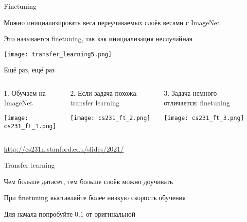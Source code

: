 \documentclass[notes,12pt, aspectratio=169]{beamer}
\newenvironment{wideitemize}{\itemize\addtolength{\itemsep}{10pt}}{\enditemize}
\begin{document}
\begin{frame}{Finetuning}
\begin{wideitemize}
	\item  Можно инициализировать веса переучиваемых слоёв весами с ImageNet
	\item  Это называется \alert{finetuning,} так как инициализация неслучайная
\end{wideitemize}
\begin{center}
	\texttt{[image: transfer\_learning5.png]}
\end{center}
\end{frame}


\begin{frame}{Ещё раз, ещё раз}
	\begin{columns}
	\begin{column}{0.33\textwidth}
		\alert{1. Обучаем на ImageNet}
		\begin{center}
			\texttt{[image: cs231\_ft\_1.png]}
		\end{center}
	\end{column}
	\hfill
	\begin{column}{0.33\textwidth}
		\alert{2. Если задача похожа: transfer learning}
		\begin{center}
			\texttt{[image: cs231\_ft\_2.png]}
		\end{center}
	\end{column}
	\hfill
	\begin{column}{0.33\textwidth}
		\alert{3. Задача немного отличается: finetuning}
		\begin{center}
			\texttt{[image: cs231\_ft\_3.png]}
		\end{center}
	\end{column}
\end{columns}
\vfill %
\footnotesize
{\color{blue}  \url{http://cs231n.stanford.edu/slides/2021/}}
\end{frame}


\begin{frame}{Transfer learning}
	\begin{wideitemize}
		\item Чем больше датасет, тем больше слоёв можно доучивать
		\item При finetuning выставляйте более низкую скорость обучения
		\item Для начала попробуйте $0.1$ от оригинальной 
	\end{wideitemize}
\end{frame}
\end{document}
